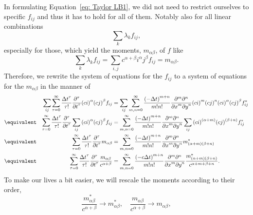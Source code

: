 In formulating Equation~\eqref{eq: Taylor LB1}, we did not need to restrict ourselves to specific $f_{ij}$ and thus it has to hold for all of them. Notably also for all linear combinations
\begin{equation*}
  \sum_{k}\lambda_k f_{ij},
\end{equation*}
especially for those, which yield the moments, $m_{\alpha\beta} $, of $f$ like
\begin{equation}
  \sum_{k}\lambda_k f_{ij} = \sum_{i,j}c^{\alpha + \beta}i^\alpha j^\beta f_{ij}=m_{\alpha\beta}.
\end{equation}
Therefore, we rewrite the system of equations for the $f_{ij}$ to a system of equations for the $m_{\alpha\beta}$ in the manner of
\begin{align}
    \nonumber
    & & \sum_{ij} \sum_{\tau = 0}^\infty \frac{{\Delta t}^\tau }{\tau!} \frac{\partial^\tau}{{\partial t}^\tau} {(ci)}^\alpha {(cj)}^\beta f_{ij}
    &=
    \sum_{ij}\sum_{m,n = 0}^\infty \frac{{(-\Delta t)}^{m+n}} {m!n!} \frac{\partial^m \partial^n}{ {\partial x}^m{\partial y}^n} {(ci)}^m {(cj)}^n {(ci)}^\alpha {(cj)}^\beta f^*_{ij}
    \\ \nonumber &\equivalent &
    \sum_{\tau = 0}^\infty \frac{{\Delta t}^\tau }{\tau!} \frac{\partial^\tau}{{\partial t}^\tau} \sum_{ij}{(ci)}^\alpha {(cj)}^\beta f_{ij}
    &=
    \sum_{m,n = 0}^\infty \frac{{(-\Delta t)}^{m+n}} {m!n!} \frac{\partial^m \partial^n}{ {\partial x}^m{\partial y}^n}\sum_{ij}{(ci)}^{(\alpha+m)} {(cj)}^{(\beta+n)} f^*_{ij}
    \\ \nonumber &\equivalent &
     \sum_{\tau = 0}^\infty \frac{{\Delta t}^\tau }{\tau!} \frac{\partial^\tau}{{\partial t}^\tau} m_{\alpha\beta} &=
    \sum_{m,n = 0}^\infty \frac{{(-\Delta t)}^{m+n}} {m!n!} \frac{\partial^m \partial^n}{ {\partial x}^m{\partial y}^n} m^*_{(\alpha + m)(\beta + n)}
     \\   &\equivalent &
     \sum_{\tau = 0}^\infty \frac{{\Delta t}^\tau }{\tau!} \frac{\partial^\tau}{{\partial t}^\tau} \frac{m_{\alpha\beta}}{c^{\alpha + \beta}} &=
    \sum_{m,n = 0}^\infty \frac{{(- c\Delta t)}^{m+n}} {m!n!} \frac{\partial^m \partial^n}{ {\partial x}^m{\partial y}^n} \frac{m^*_{(\alpha + m)(\beta + n)}}{c^{\alpha + m + \beta + n}}.
\end{align}
To make our lives a bit easier, we will rescale the moments according to their order,
\begin{equation}
  \label{eq: rescaling the moments}
  \frac{m^*_{\alpha\beta}}{c^{\alpha + \beta}} \rightarrow m^*_{\alpha\beta}, \quad   \frac{m_{\alpha\beta}}{c^{\alpha + \beta}} \rightarrow m_{\alpha\beta},
\end{equation}
